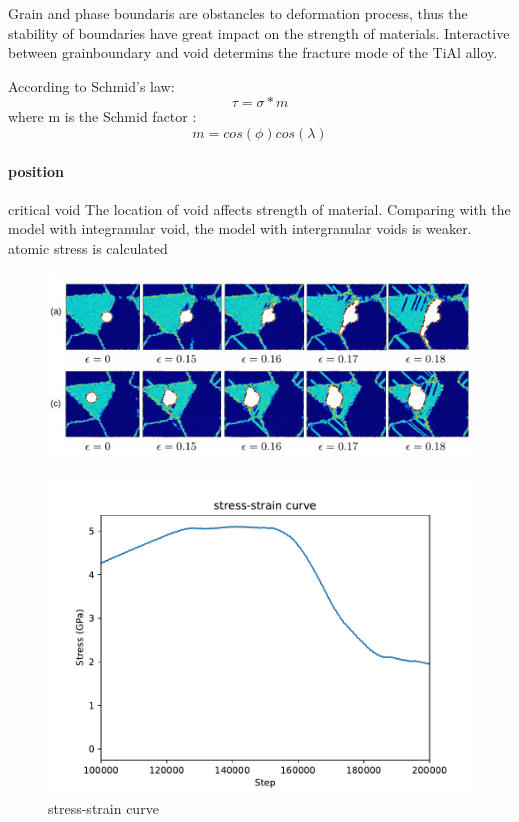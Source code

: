 \documentclass[times]{elsarticle}
\begin{document}
Grain and phase boundaris are obstancles to deformation process, thus the stability of boundaries have great impact on the strength of materials. Interactive between grainboundary and void determins the fracture mode of the TiAl alloy.

According to Schmid's law:
$$\tau = \sigma*m$$
where m is the Schmid factor :
$$ m = cos(\phi)cos(\lambda)$$

\paragraph{position}critical void 
The location of void affects strength of material. Comparing with the model with integranular void, the model with intergranular voids is weaker. atomic stress is calculated 

\begin{figure}
	\centering
	\includegraphics[width=1\linewidth]{"img/fracture process"}
	\caption{}
	\label{fig:fracture-process}
\end{figure}




\begin{figure}
	\centering
	\includegraphics[width=0.7\linewidth]{img/ialine}
	\caption{stress-strain curve}
	\label{fig:ia_line}
\end{figure}
\end{document}
